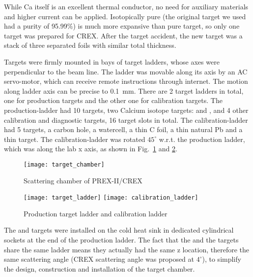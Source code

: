 While Ca itself is an excellent thermal conductor, no need for auxiliary 
materials and higher current can be applied. Isotopically pure \Ca (the original
target we used had a purity of 95.99\%) is much more 
expansive than pure \Pb target, so only one \Ca target was prepared for CREX. 
After the target accident, 
the new \Ca target was a stack of three separated foils with similar total thickness.

Targets were firmly mounted in bays of target ladders, whose axes were 
perpendicular to the beam line. The ladder was movable along its axis by an 
AC servo-motor, which can receive remote instructions through internet. 
The motion along ladder axis can be precise to 0.1~mm.
There are 2 target ladders in total, one for production targets and the other
one for calibration targets. The production-ladder had 10 \Pb targets, 
two Calcium isotope targets: \ca and \Ca, and 4 other calibration and diagnostic
targets, 16 target slots in total. The calibration-ladder had 5 targets, a carbon 
hole, a watercell, a thin C foil, a thin natural Pb and a thin \ca target.
The calibration-ladder was rotated $45^\circ$ w.r.t. the production ladder, 
which was along the lab x axis, as shown in Fig.~\ref{fig:scattering_chamber}
and \ref{fig:target_ladder}.

\begin{figure}[h!]
    \centering
    \texttt{[image: target\_chamber]}
    \caption{Scattering chamber of PREX-II/CREX}
    \label{fig:scattering_chamber}
\end{figure}
\begin{figure}[h!]
    \centering
    \texttt{[image: target\_ladder]}
    \texttt{[image: calibration\_ladder]}
    \caption{Production target ladder and calibration ladder}
    \label{fig:target_ladder}
\end{figure}

The \ca and \Ca targets were installed on the cold heat sink in dedicated cylindrical 
sockets at the end of the production ladder. %
The fact that the \Ca and the \Pb 
targets share the same ladder means they actually had the same z location,
therefore the same scattering angle (CREX scattering angle was proposed at $4^\circ$), 
to simplify the design, construction and installation of the target chamber.

